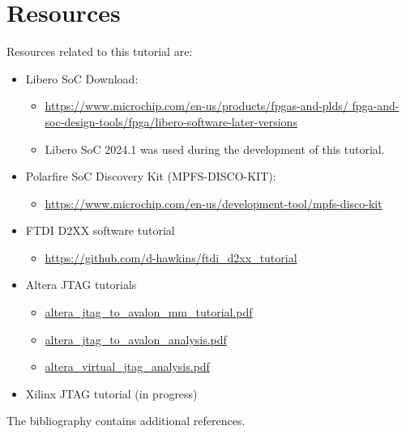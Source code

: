 \section{Resources}
\label{sec:resources}

Resources related to this tutorial are:
%
\begin{itemize}
\item Libero SoC Download:
%
\begin{itemize}
\item
\href{https://www.microchip.com/en-us/products/fpgas-and-plds/fpga-and-soc-design-tools/fpga/libero-software-later-versions}
{https://www.microchip.com/en-us/products/fpgas-and-plds/\newline
fpga-and-soc-design-tools/fpga/libero-software-later-versions}

\item
Libero SoC 2024.1 was used during the development of this tutorial.
\end{itemize}

\item Polarfire SoC Discovery Kit (MPFS-DISCO-KIT):
%
\begin{itemize}
\item
\href{https://www.microchip.com/en-us/development-tool/mpfs-disco-kit}
{https://www.microchip.com/en-us/development-tool/mpfs-disco-kit}
\end{itemize}

\item FTDI D2XX software tutorial
%
\begin{itemize}
\item
\href{https://github.com/d-hawkins/ftdi_d2xx_tutorial}
{https://github.com/d-hawkins/ftdi\_d2xx\_tutorial}
\end{itemize}

\item Altera JTAG tutorials
%
\begin{itemize}
\item
\href{https://github.com/d-hawkins/altera_jtag_to_avalon_mm_tutorial/blob/main/doc/altera_jtag_to_avalon_mm_tutorial.pdf}
{altera\_jtag\_to\_avalon\_mm\_tutorial.pdf}

\item
\href{https://github.com/d-hawkins/altera_jtag_to_avalon_analysis/blob/main/doc/altera_jtag_to_avalon_analysis.pdf}
{altera\_jtag\_to\_avalon\_analysis.pdf}

\item
\href{https://github.com/d-hawkins/altera_virtual_jtag_analysis/blob/main/doc/altera_virtual_jtag_analysis.pdf}
{altera\_virtual\_jtag\_analysis.pdf}
\end{itemize}

\item Xilinx JTAG tutorial (in progress)

\end{itemize}
%
The bibliography contains additional references.